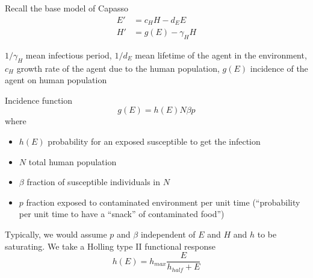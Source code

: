 \documentclass[aspectratio=169]{beamer}
\begin{document}
\begin{frame}{Recall the base model of Capasso}
  \begin{subequations}
    \label{sys:capasso_EH}
    \begin{align}
      E' &= c_HH-d_EE \label{sys:capasso_EH_dE} \\
      H' &= g(E)-\gamma_HH \label{sys:capasso_EH_dH}
    \end{align}
  \end{subequations}
  \begin{center}
    \def\vertskip{*1.75}
    \def\horzskip{*2}
  \end{center}
  $1/\gamma_H$ mean infectious period, $1/d_E$ mean lifetime of the agent in the environment, $c_H$ growth rate of the agent due to the human population, $g(E)$ incidence of the agent on human population
\end{frame}


\begin{frame}{Incidence function}
  \begin{equation}
    \label{eq:incidence_function_Capasso}
    g(E) = h(E)N\beta p
  \end{equation}
  where
  \begin{itemize}
    \item $h(E)$ probability for an exposed susceptible to get the infection
    \item $N$ total human population
    \item $\beta$ fraction of susceptible individuals in $N$
    \item $p$ fraction exposed to contaminated environment per unit time (``probability per unit time to have a ``snack'' of contaminated food'')
  \end{itemize}
  Typically, we would assume $p$ and $\beta$ independent of $E$ and $H$ and $h$ to be saturating. We take a Holling type II functional response
  \begin{equation}
    h(E)=h_{max}\frac{E}{h_{half}+E}
  \end{equation}
\end{frame}
\end{document}
